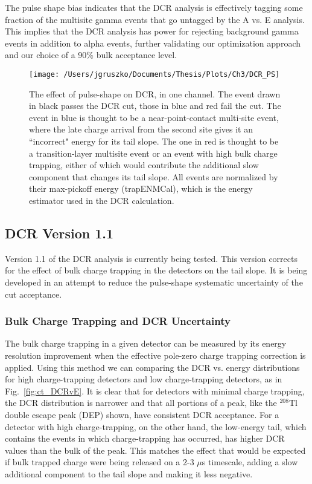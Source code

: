 The pulse shape bias indicates that the DCR analysis is effectively tagging some fraction of the multisite gamma events that go untagged by the A vs. E analysis. This implies that the DCR analysis has power for rejecting background gamma events in addition to alpha events, further validating our optimization approach and our choice of a 90\% bulk acceptance level.  

\begin{figure}[]
 \centering
 \texttt{[image: /Users/jgruszko/Documents/Thesis/Plots/Ch3/DCR\_PS]}
 \caption[Sample waveforms demonstrating the effect of pulse-shape on DCR]{The effect of pulse-shape on DCR, in one channel. The event drawn in black passes the DCR cut, those in blue and red fail the cut. The event in blue is thought to be a near-point-contact multi-site event, where the late charge arrival from the second site gives it an ``incorrect" energy for its tail slope. The one in red is thought to be a transition-layer multisite event or an event with high bulk charge trapping, either of which would contribute the additional slow component that changes its tail slope. All events are normalized by their max-pickoff energy (trapENMCal), which is the energy estimator used in the DCR calculation.} 
 \label{fig:DCR_PS}
\end{figure}

\subsection{DCR Version 1.1}
Version 1.1 of the DCR analysis is currently being tested. This version corrects for the effect of bulk charge trapping in the detectors on the tail slope. It is being developed in an attempt to reduce the pulse-shape systematic uncertainty of the cut acceptance. 
 
\subsubsection{Bulk Charge Trapping and DCR Uncertainty}
The bulk charge trapping in a given detector can be measured by its energy resolution improvement when the effective pole-zero charge trapping correction is applied. Using this method we can comparing the DCR vs. energy distributions for high charge-trapping detectors and low charge-trapping detectors, as in Fig.~\ref{fig:ct_DCRvE}. It is clear that for detectors with minimal charge trapping, the DCR distribution is narrower and that all portions of a peak, like the $^{208}$Tl double escape peak (DEP) shown, have consistent DCR acceptance. For a detector with high charge-trapping, on the other hand, the low-energy tail, which contains the events in which charge-trapping has occurred, has higher DCR values than the bulk of the peak. This matches the effect that would be expected if bulk trapped charge were being released on a 2-3 $\mu$s timescale, adding a slow additional component to the tail slope and making it less negative. 

